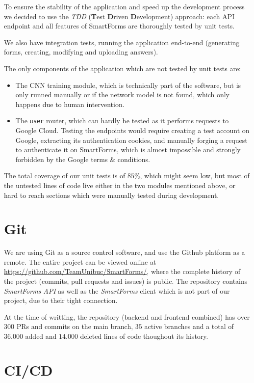 \documentclass[11pt, a4paper]{report}
\def\code#1{\texttt{#1}}
\begin{document}
To ensure the stability of the application and speed up the development process we decided to use the \textit{TDD} (\textbf{T}est \textbf{D}riven \textbf{D}evelopment) approach: each API endpoint and all features of SmartForms are thoroughly tested by unit tests.

We also have integration tests, running the application end-to-end (generating forms, creating, modifying and uploading answers).

The only components of the application which are not tested by unit tests are:
\begin{itemize}
	\item The CNN training module, which is technically part of the software, but is only runned manually or if the network model is not found, which only happens due to human intervention.
	\item The \code{user} router, which can hardly be tested as it performs requests to Google Cloud. Testing the endpoints would require creating a test account on Google, extracting its authentication cookies, and manually forging a request to authenticate it on SmartForms, which is almost impossible and strongly forbidden by the Google terms \& conditions. 
\end{itemize}

The total coverage of our unit tests is of $85\%$, which might seem low, but most of the untested lines of code live either in the two modules mentioned above, or hard to reach sections which were manually tested during development.

\section{Git}

We are using Git\cite{Git} as a source control software, and use the Github platform as a remote. The entire project can be viewed online at \url{https://github.com/TeamUnibuc/SmartForms/}, where the complete history of the project (commits, pull requests and issues) is public. The repository contains \textit{SmartForms API} as well as the \textit{SmartForms} client which is not part of our project, due to their tight connection.

At the time of writting, the repository (backend and frontend combined) has over $300$ PRs and commits on the main branch, $35$ active branches and a total of $36.000$ added and $14.000$ deleted lines of code thoughout its history. 


\section{CI/CD}
\end{document}
